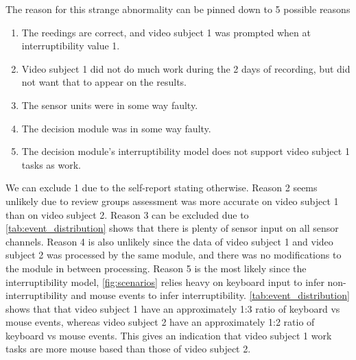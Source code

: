 \documentclass{sigchi}
\begin{document}
The reason for this strange abnormality can be pinned down to 5 possible reasons
\begin{enumerate}
  \item The reedings are correct, and video subject 1 was prompted when at interruptibility value 1.
  \item Video subject 1 did not do much work during the 2 days of recording, but did not want that to appear on the results.
  \item The sensor units were in some way faulty.
  \item The decision module was in some way faulty.
  \item The decision module's interruptibility model does not support video subject 1 tasks as work.
\end{enumerate}
We can exclude 1 due to the self-report stating otherwise.
Reason 2 seems unlikely due to review groups assessment was more accurate on video subject 1 than on video subject 2.
Reason 3 can be excluded due to \autoref{tab:event_distribution} shows that there is plenty of sensor input on all sensor channels.
Reason 4 is also unlikely since the data of video subject 1 and video subject 2 was processed by the same module, and there was no modifications to the module in between processing.
Reason 5 is the most likely since the interruptibility model, \autoref{fig:scenarios} relies heavy on keyboard input to infer non-interruptibility and mouse events to infer interruptibility. \autoref{tab:event_distribution} shows that that video subject 1 have an approximately 1:3 ratio of keyboard vs mouse events, whereas video subject 2 have an approximately 1:2 ratio of keyboard vs mouse events.
This gives an indication that video subject 1 work tasks are more mouse based than those of video subject 2.
\end{document}
